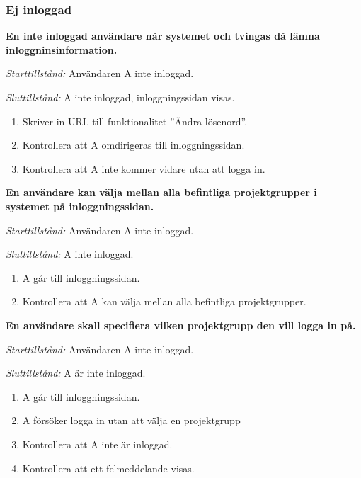 \documentclass[a4paper]{article}
\begin{document}
\subsubsection{Ej inloggad}
\begin{FT}
\item
\textbf{En inte inloggad användare når systemet och tvingas då lämna inloggninsinformation.}

\emph{Starttillstånd:} Användaren A inte inloggad.

\emph{Sluttillstånd:} A inte inloggad, inloggningssidan visas.

\begin{enumerate}
\item Skriver in URL till funktionalitet ''Ändra lösenord''.
\item Kontrollera att A omdirigeras till inloggningssidan.
\item Kontrollera att A inte kommer vidare utan att logga in.
\end{enumerate}

\item
\textbf{En användare kan välja mellan alla befintliga projektgrupper i systemet på inloggningssidan.}

\emph{Starttillstånd:} Användaren A inte inloggad.

\emph{Sluttillstånd:} A inte inloggad.

\begin{enumerate}
\item A går till inloggningssidan.
\item Kontrollera att A kan välja mellan alla befintliga projektgrupper.
\end{enumerate}

\item
\textbf{En användare skall specifiera vilken projektgrupp den vill logga in på.}

\emph{Starttillstånd:} Användaren A inte inloggad.

\emph{Sluttillstånd:} A är inte inloggad.

\begin{enumerate}
\item A går till inloggningssidan.
\item A försöker logga in utan att välja en projektgrupp
\item Kontrollera att A inte är inloggad.
\item Kontrollera att ett felmeddelande visas.
\end{enumerate}


\end{FT}
\end{document}
